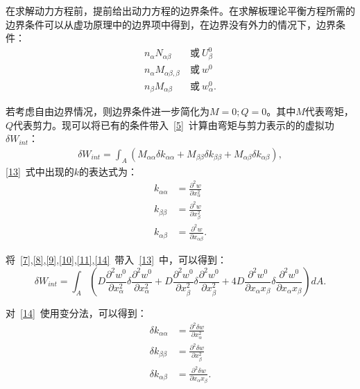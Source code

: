 \documentclass[withoutpreface,bwprint]{cumcmthesis} %
\begin{document}
在求解动力方程前，提前给出动力方程的边界条件。在求解板理论平衡方程所需的边界条件可以从虚功原理中的边界项中得到，在边界没有外力的情况下，边界条件：
\begin{equation}
    \begin{aligned}
     n_\alpha N_{\alpha\beta} &~\text{或}~U_\beta^0\\
     n_\alpha M_{\alpha\beta,\beta} &~\text{或}~w^0\\
     n_\beta M_{\alpha\beta}&~\text{或}~w_\alpha^0.
    \end{aligned}\label{12}
\end{equation}

若考虑自由边界情况，则边界条件进一步简化为$M=0;Q=0$。其中$M$代表弯矩，$Q$代表剪力。现可以将已有的条件带入~\eqref{5}~计算由弯矩与剪力表示的的虚拟功$\delta W_{int}$：
\begin{equation}
    \begin{aligned}
        \delta W_{int}=\int_A\left(M_{\alpha\alpha}\delta k_{\alpha\alpha}+M_{\beta\beta}\delta k_{\beta\beta}+M_{\alpha\beta}\delta k_{\alpha\beta}\right),
    \end{aligned}\label{13}
\end{equation}
\eqref{13}~式中出现的$k$的表达式为：
\begin{equation}
    \begin{aligned}
        k_{\alpha\alpha}&=\frac{\partial^2w}{\partial x_\alpha^2}\\
        k_{\beta\beta}&=\frac{\partial^2w}{\partial x_\beta^2}\\
        k_{\alpha\beta}&=\frac{\partial^2w}{\partial x_{\alpha\beta}}.
    \end{aligned}\label{14}
\end{equation}

将~\eqref{7},\eqref{8},\eqref{9},\eqref{10},\eqref{11},\eqref{14}~带入~\eqref{13}~中，可以得到：
\begin{equation}
        \delta W_{int}=\int_A\left(D\frac{\partial^2 w^0}{\partial x_{\alpha}^2}\delta\frac{\partial^2w^0}{\partial x_{\alpha}^2}+D\frac{\partial^2w^0}{\partial x_{\beta}^2}\delta\frac{\partial^2w^0}{\partial x_{\beta}^2}+4D\frac{\partial^2w^0}{\partial x_{\alpha}x_{\beta}}\delta\frac{\partial^2w^0}{\partial x_{\alpha}x_{\beta}}\right)dA\label{15}.
\end{equation}

对~\eqref{14}~使用变分法，可以得到：
\begin{equation}
    \begin{aligned}
        \delta 
 k_{\alpha\alpha}&=\frac{\partial^2 \delta w}{\partial x_\alpha^2}\\
         \delta k_{\beta\beta}&=\frac{\partial^2 \delta w}{\partial x_\beta^2}\\
         \delta k_{\alpha\beta}&=\frac{\partial^2 \delta w}{\partial x_\alpha x_\beta}.
    \end{aligned}\label{16}
\end{equation}
\end{document}
